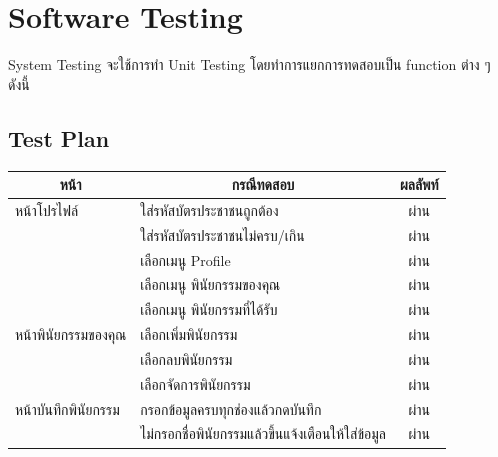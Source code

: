 \documentclass[12pt,oneside,openright,a4paper]{cpe-thai-project}
\begin{document}
\clearpage
\section{Software Testing}
\tab System Testing จะใช้การทำ Unit Testing โดยทำการแยกการทดสอบเป็น function ต่าง ๆ ดังนี้
\subsection {Test Plan}
\begin{table}[h]
\begin{tabular}{|l|l|l|}
\hline
\multicolumn{1}{|c|}{\textbf{\centering หน้า}} & \multicolumn{1}{c|}{\textbf{\centering กรณีทดสอบ}} & \multicolumn{1}{c|}{\textbf{\centering ผลลัพท์}} \\
\hline
 หน้าโปรไฟล์           & ใส่รหัสบัตรประชาชนถูกต้อง                        &    \multicolumn{1}{c|}{{\color[HTML]{228B22} ผ่าน}} \\ \hline
                       & ใส่รหัสบัตรประชาชนไม่ครบ/เกิน                    &   \multicolumn{1}{c|}{{\color[HTML]{228B22} ผ่าน}}     \\ \hline
                       & เลือกเมนู Profile                            &   \multicolumn{1}{c|}{{\color[HTML]{228B22} ผ่าน}}      \\ \hline
                       & เลือกเมนู พินัยกรรมของคุณ                     &    \multicolumn{1}{c|}{{\color[HTML]{228B22} ผ่าน}}    \\ \hline
                       & เลือกเมนู  พินัยกรรมที่ได้รับ                    &   \multicolumn{1}{c|}{{\color[HTML]{228B22} ผ่าน}}     \\ \hline
หน้าพินัยกรรมของคุณ        & เลือกเพิ่มพินัยกรรม                              &   \multicolumn{1}{c|}{{\color[HTML]{228B22} ผ่าน}}    \\ \hline
                       & เลือกลบพินัยกรรม                                 &     \multicolumn{1}{c|}{{\color[HTML]{228B22} ผ่าน}}   \\ \hline
                       & เลือกจัดการพินัยกรรม                           &  \multicolumn{1}{c|}{{\color[HTML]{228B22} ผ่าน}}     \\ \hline
หน้าบันทึกพินัยกรรม        & กรอกข้อมูลครบทุกช่องแล้วกดบันทึก                   & \multicolumn{1}{c|}{{\color[HTML]{228B22} ผ่าน}}        \\ \hline
                       & ไม่กรอกชื่อพินัยกรรมแล้วขึ้นแจ้งเตือนให้ใส่ข้อมูล                      & \multicolumn{1}{c|}{{\color[HTML]{228B22} ผ่าน}}       \\ \hline

\end{tabular}
\end{table}
\end{document}
